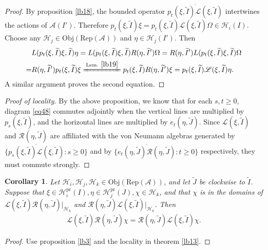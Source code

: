 \documentclass[12pt,a4paper]{article}
\theoremstyle{definition}
\theoremstyle{plain}
\newtheorem{co}[df]{Corollary}
\newcommand{\mc}{\mathcal}
\newcommand{\wtd}{\widetilde}
\newcommand{\ovl}{\overline}
\newcommand{\scr}{\mathscr}
\newcommand{\RepA}{\mathrm{Rep}(\mc A)}
\newcommand{\Obj}{\mathrm{Obj}}
\newcommand{\pr}{\mathrm{pr}}
\numberwithin{equation}{subsection}
\begin{document}
\begin{proof}
	By proposition \ref{lb18}, the bounded operator $\ovl{p_t(\xi,\wtd I)\scr L(\xi,\wtd I)}$ intertwines the actions of $\mc A(I')$. Therefore $p_t(\xi,\wtd I)\xi=p_t(\xi,\wtd I)\scr L(\xi,\wtd I)\Omega\in\mc H_i(I)$.  Choose any $\mc H_j\in\Obj(\RepA)$ and $\eta\in\mc H_j(I')$. Then
	\begin{align*}
	&L(p_t(\xi,\wtd I)\xi,\wtd I)\eta=L(p_t(\xi,\wtd I)\xi,\wtd I)R(\eta,\wtd I')\Omega=R(\eta,\wtd I')L(p_t(\xi,\wtd I)\xi,\wtd I)\Omega\\
	=&R(\eta,\wtd I')p_t(\xi,\wtd I)\xi \xlongequal{\text{Lem. } \ref{lb19}} p_t(\xi,\wtd I)R(\eta,\wtd I')\xi=p_t(\xi,\wtd I)\scr L(\xi,\wtd I)\eta.
	\end{align*}
	A similar argument proves the second equation.
\end{proof}


\begin{proof}[Proof of locality]
	By the above proposition, we know that for each $s,t\geq 0$, diagram \eqref{eq48} commutes adjointly when the vertical lines are multiplied by $p_s(\xi,\wtd I)$, and the horizontal lines are multiplied by $e_t(\eta,\wtd J)$. Since $\scr L(\xi,\wtd I)$ and $\scr R(\eta,\wtd J)$ are affiliated with the von Neumann algebras generated by $\{\ovl{p_s(\xi,\wtd I)\scr L(\xi,\wtd I)}:s\geq 0 \}$ and by $\{\ovl {e_t(\eta,\wtd J)\scr R(\eta,\wtd J)}:t\geq 0\}$ respectively, they must commute strongly.
\end{proof} 

\begin{co}\label{lb25}
	Let $\mc H_i,\mc H_j,\mc H_k\in\Obj(\RepA)$, and let $\wtd J$ be clockwise to $\wtd I$. Suppose that $\xi\in\mc H_i^\pr(I),\eta\in\mc H_j^\pr(J),\chi\in\mc H_k$, and that $\chi$ is in the domains of $\scr L(\xi,\wtd I)\scr R(\eta,\wtd J)|_{\mc H_k}$ and $\scr R(\eta,\wtd J)\scr L(\xi,\wtd I)|_{\mc H_k}$. Then
	\begin{align}
	\scr L(\xi,\wtd I)\scr R(\eta,\wtd J)\chi=\scr R(\eta,\wtd J)\scr L(\xi,\wtd I)\chi.
	\end{align}
\end{co}

\begin{proof}
	Use proposition \ref{lb3} and the locality in theorem \ref{lb13}.
\end{proof}
\end{document}
